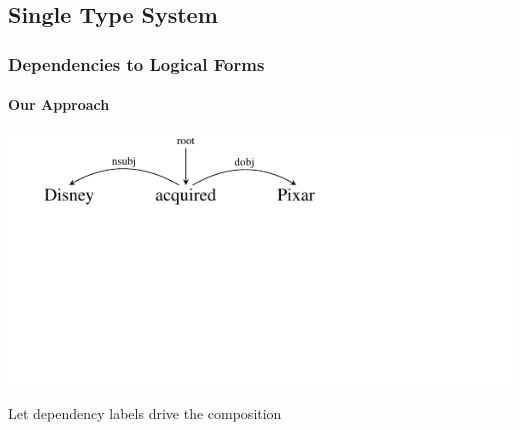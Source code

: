 \documentclass[mathserif,12pt]{beamer}
\begin{document}
\subsection{Single Type System}
\begin{frame}
\frametitle{Dependencies to Logical Forms}
\framesubtitle{Our Approach}
\begin{center}
\vspace{-5em}
\includegraphics[trim=2em 9.4em 10em 0em,clip=true,scale=1.3]{figures/pixar}

\vspace{2cm}
\begin{block}{}
\centering
Let dependency labels drive the composition
\end{block}
\end{center}
\end{frame}
\end{document}

